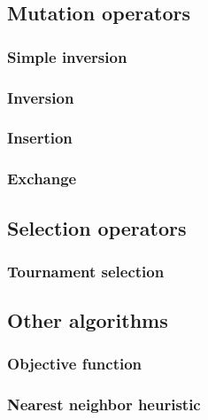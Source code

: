 ﻿\documentclass[a4paper,english,11pt,]{scrartcl}
\begin{document}
\subsection{Mutation operators} 
\label{appendix:mutation}
\subsubsection{Simple inversion}
 

\subsubsection{Inversion}
 

\subsubsection{Insertion}
 

\subsubsection{Exchange}
 



\clearpage
\subsection{Selection operators} 
\label{appendix:selection}

\subsubsection{Tournament selection}
 


\subsection{Other algorithms}
\subsubsection{Objective function}
 
\subsubsection{Nearest neighbor heuristic}
 

\clearpage

\makeatletter
\def\url@leostyle{%
  \@ifundefined{selectfont}{\def\UrlFont{\sf}}{\def\UrlFont{\small\ttfamily}}}
\makeatother


\end{document}
